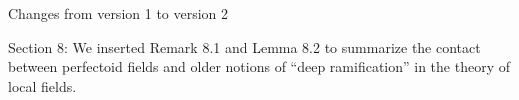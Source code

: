\documentclass[12pt]{amsart}
\begin{document}
\begin{center}
Changes from version 1 to version 2
\end{center}

Section 8: We inserted Remark 8.1 and Lemma 8.2 to summarize the contact between perfectoid fields and older notions of ``deep ramification'' in the theory of local fields.
\end{document}
